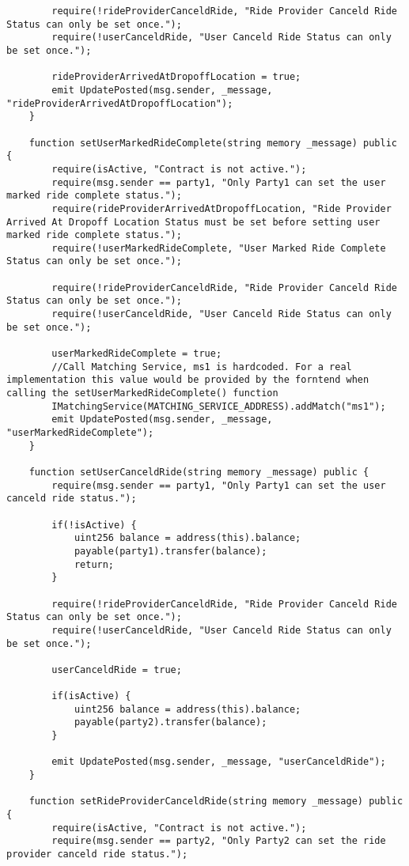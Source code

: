 \begin{lstlisting}
        require(!rideProviderCanceldRide, "Ride Provider Canceld Ride Status can only be set once.");
        require(!userCanceldRide, "User Canceld Ride Status can only be set once.");

        rideProviderArrivedAtDropoffLocation = true;
        emit UpdatePosted(msg.sender, _message, "rideProviderArrivedAtDropoffLocation");
    }

    function setUserMarkedRideComplete(string memory _message) public {
        require(isActive, "Contract is not active.");
        require(msg.sender == party1, "Only Party1 can set the user marked ride complete status.");
        require(rideProviderArrivedAtDropoffLocation, "Ride Provider Arrived At Dropoff Location Status must be set before setting user marked ride complete status.");
        require(!userMarkedRideComplete, "User Marked Ride Complete Status can only be set once.");

        require(!rideProviderCanceldRide, "Ride Provider Canceld Ride Status can only be set once.");
        require(!userCanceldRide, "User Canceld Ride Status can only be set once.");

        userMarkedRideComplete = true;
        //Call Matching Service, ms1 is hardcoded. For a real implementation this value would be provided by the forntend when calling the setUserMarkedRideComplete() function
        IMatchingService(MATCHING_SERVICE_ADDRESS).addMatch("ms1");
        emit UpdatePosted(msg.sender, _message, "userMarkedRideComplete");
    }

    function setUserCanceldRide(string memory _message) public {
        require(msg.sender == party1, "Only Party1 can set the user canceld ride status.");
        
        if(!isActive) {
            uint256 balance = address(this).balance;
            payable(party1).transfer(balance);
            return;
        }

        require(!rideProviderCanceldRide, "Ride Provider Canceld Ride Status can only be set once.");
        require(!userCanceldRide, "User Canceld Ride Status can only be set once.");

        userCanceldRide = true;
        
        if(isActive) {
            uint256 balance = address(this).balance;
            payable(party2).transfer(balance);
        }
        
        emit UpdatePosted(msg.sender, _message, "userCanceldRide");
    }

    function setRideProviderCanceldRide(string memory _message) public {
        require(isActive, "Contract is not active.");
        require(msg.sender == party2, "Only Party2 can set the ride provider canceld ride status.");
        

\end{lstlisting}
